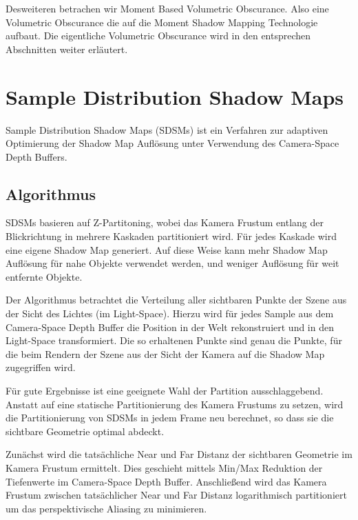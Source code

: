 \documentclass[runningheaders,a4paper]{llncs}
\begin{document}
Desweiteren betrachen wir Moment Based Volumetric Obscurance. Also eine Volumetric Obscurance die auf die Moment Shadow Mapping Technologie aufbaut. Die eigentliche Volumetric Obscurance wird in den entsprechen Abschnitten weiter erläutert.

\section{Sample Distribution Shadow Maps}

Sample Distribution Shadow Maps (SDSMs) ist ein Verfahren zur adaptiven Optimierung der Shadow Map Auflösung unter Verwendung des Camera-Space Depth Buffers.

\subsection{Algorithmus}

SDSMs basieren auf Z-Partitoning, wobei das Kamera Frustum entlang der Blickrichtung in mehrere Kaskaden partitioniert wird.
Für jedes Kaskade wird eine eigene Shadow Map generiert.
Auf diese Weise kann mehr Shadow Map Auflösung für nahe Objekte verwendet werden, und weniger Auflösung für weit entfernte Objekte.


Der Algorithmus betrachtet die Verteilung aller sichtbaren Punkte der Szene aus der Sicht des Lichtes (im Light-Space).
Hierzu wird für jedes Sample aus dem Camera-Space Depth Buffer die Position in der Welt rekonstruiert und in den Light-Space transformiert.
Die so erhaltenen Punkte sind genau die Punkte, für die beim Rendern der Szene aus der Sicht der Kamera auf die Shadow Map zugegriffen wird.


Für gute Ergebnisse ist eine geeignete Wahl der Partition ausschlaggebend.
Anstatt auf eine statische Partitionierung des Kamera Frustums \cite{pssm} zu setzen, wird die Partitionierung von SDSMs in jedem Frame neu berechnet, so dass sie die sichtbare Geometrie optimal abdeckt.

Zunächst wird die tatsächliche Near und Far Distanz der sichtbaren Geometrie im Kamera Frustum ermittelt.
Dies geschieht mittels Min/Max Reduktion der Tiefenwerte im Camera-Space Depth Buffer.
Anschließend wird das Kamera Frustum zwischen tatsächlicher Near und Far Distanz logarithmisch partitioniert um das perspektivische Aliasing zu minimieren.
\end{document}
